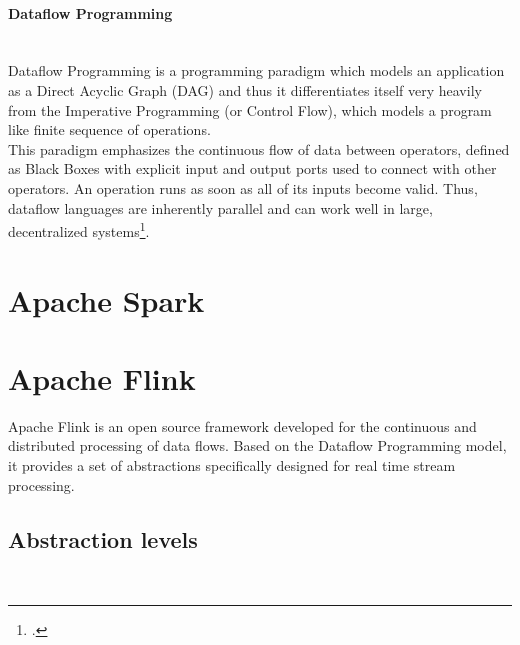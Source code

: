 \paragraph{Dataflow Programming}  \label{DataflowProg} ~\\

Dataflow Programming is a programming paradigm which models an application as a Direct Acyclic Graph (DAG) and thus it differentiates itself very heavily from the Imperative Programming (or Control Flow), which models a program like finite sequence of operations.\\
This paradigm emphasizes the continuous flow of data between operators, defined as Black Boxes with explicit input and output ports used to connect with other operators. An operation runs as soon as all of its inputs become valid. Thus, dataflow languages are inherently parallel and can work well in large, decentralized systems\footcite{DataflowProgramming}.\\

\section{Apache Spark} \label{Spark}

\section{Apache Flink}\label{Flink}

Apache Flink is an open source framework developed for the continuous and distributed processing of data flows. Based on the Dataflow Programming model, it provides a set of abstractions specifically designed for real time stream processing.

\subsection{Abstraction levels}  \label{AbstractionLevels} ~\\

